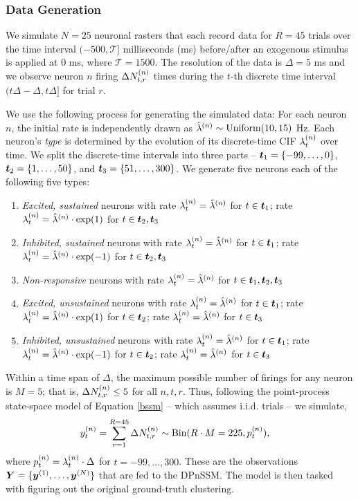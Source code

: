 \documentclass[twoside]{article}
\begin{document}
\subsubsection{Data Generation} \label{sssec:sim-data}
We simulate $N = 25$ neuronal rasters that each record data for $R = 45$ trials over the time interval $(-500, \mathcal{T}]$ milliseconds (ms) before/after an exogenous stimulus is applied at 0 ms, where $\mathcal{T} = 1500$.  The resolution of the data is $\Delta = 5$ ms and we observe neuron $n$ firing $\Delta \idx[t, r] N n$ times during the $t$-th discrete time interval $(t\Delta - \Delta, t\Delta]$ for trial $r$.  

We use the following process for generating the simulated data:  For each neuron $n$, the initial rate is independently drawn as $\idx \hlambda n \sim \text{Uniform}(10, 15)$ Hz.  Each neuron's \emph{type} is determined by the evolution of its discrete-time CIF  $\idx[t] \lambda n $ over time.  We split the discrete-time intervals into three parts -- $\bd t_1 = \{-99, \ldots, 0\}$, $\bd t_2 = \{1, \ldots, 50\}$, and $\bd t_3 = \{51, \ldots, 300\}$.  We generate five neurons each of the following five types: 
\begin{enumerate}
\item \emph{Excited, sustained} neurons with rate $\idx[t] \lambda n = \idx \hlambda n$ for $t \in \bd t_1$; rate $\idx[t] \lambda n = \idx \hlambda n \cdot \exp(1)$ for $t \in \bd t_2, \bd t_3$
\item \emph{Inhibited, sustained} neurons with rate $\idx[t] \lambda n = \idx \hlambda n$ for $t \in \bd t_1$; rate $\idx[t] \lambda n = \idx \hlambda n \cdot \exp(-1)$ for $t \in \bd t_2, \bd t_3$
\item \emph{Non-responsive} neurons with rate $\idx[t] \lambda n = \idx \hlambda n$ for $t \in \bd t_1, \bd t_2, \bd t_3$
\item \emph{Excited, unsustained} neurons with rate $\idx[t] \lambda n = \idx \hlambda n$ for $t \in \bd t_1$; rate $\idx[t] \lambda n = \idx \hlambda n \cdot \exp(1)$ for $t \in \bd t_2$; rate $\idx[t] \lambda n = \idx \hlambda n$ for $t \in \bd t_3$
\item \emph{Inhibited, unsustained} neurons with rate $\idx[t] \lambda n = \idx \hlambda n$ for $t \in \bd t_1$; rate $\idx[t] \lambda n = \idx \hlambda n \cdot \exp(-1)$ for $t \in \bd t_2$; rate $\idx[t] \lambda n = \idx \hlambda n$ for $t \in \bd t_3$
\end{enumerate}

Within a time span of $\Delta$, the maximum possible number of firings for any neuron is $M = 5$; that is, $\Delta \idx[t, r] N n \leq 5$ for all $n, t, r$.  Thus, following the point-process state-space model of Equation \ref{bssm} -- which assumes i.i.d. trials -- we simulate, 
\begin{align}
\idx[t] y n = \sum_{r=1}^{R=45} \Delta \idx[t, r] N n &\sim \text{Bin}(R \cdot M = 225, \idx[t] p n),
\end{align}
where $\idx[t] p n = \idx[t] \lambda n \cdot \Delta$ for $t = -99, \ldots, 300$.  These are the observations $\bd Y = \{\bidx y 1, \ldots, \bidx y N\}$ that are fed to the DPnSSM.  The model is then tasked with figuring out the original ground-truth clustering.
\end{document}
